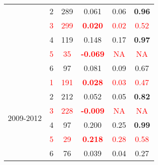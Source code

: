 \begin{table}
\begin{tabular}{rrrrrr}
    \multicolumn{1}{c}{} & \multicolumn{1}{c}{2} & \multicolumn{1}{c}{289} & \multicolumn{1}{c}{0.061 } & \multicolumn{1}{c}{0.06 } & \multicolumn{1}{c}{\textbf{0.96}} \\
    \multicolumn{1}{c}{} & \multicolumn{1}{c}{\textcolor{red}{3}} & \multicolumn{1}{c}{\textcolor{red}{299}} & \multicolumn{1}{c}{\textcolor{red}{\textbf{0.020}}} & \multicolumn{1}{c}{\textcolor{red}{0.02}} & \multicolumn{1}{c}{\textcolor{red}{0.52}} \\
    \multicolumn{1}{c}{} & \multicolumn{1}{c}{4} & \multicolumn{1}{c}{119} & \multicolumn{1}{c}{0.148 } & \multicolumn{1}{c}{0.17 } & \multicolumn{1}{c}{\textbf{0.97}} \\
    \multicolumn{1}{c}{} & \multicolumn{1}{c}{\textcolor{red}{5}} & \multicolumn{1}{c}{\textcolor{red}{35}} & \multicolumn{1}{c}{\textcolor{red}{\textbf{-0.069}}} & \multicolumn{1}{c}{\textcolor{red}{NA}} & \multicolumn{1}{c}{\textcolor{red}{NA}} \\
    \multicolumn{1}{c}{} & \multicolumn{1}{c}{6} & \multicolumn{1}{c}{97} & \multicolumn{1}{c}{0.081 } & \multicolumn{1}{c}{0.09 } & \multicolumn{1}{c}{0.67 } \\\midrule
    \multicolumn{1}{c}{\multirow{6}[2]{*}{\begin{sideways}2009-2012\end{sideways}}} & \multicolumn{1}{c}{\textcolor{red}{1}} & \multicolumn{1}{c}{\textcolor{red}{191}} & \multicolumn{1}{c}{\textcolor{red}{\textbf{0.028}}} & \multicolumn{1}{c}{\textcolor{red}{0.03}} & \multicolumn{1}{c}{\textcolor{red}{0.47}} \\
    \multicolumn{1}{c}{} & \multicolumn{1}{c}{2} & \multicolumn{1}{c}{212} & \multicolumn{1}{c}{0.052 } & \multicolumn{1}{c}{0.05 } & \multicolumn{1}{c}{\textbf{0.82}} \\
    \multicolumn{1}{c}{} & \multicolumn{1}{c}{\textcolor{red}{3}} & \multicolumn{1}{c}{\textcolor{red}{228}} & \multicolumn{1}{c}{\textcolor{red}{\textbf{-0.009}}} & \multicolumn{1}{c}{\textcolor{red}{NA}} & \multicolumn{1}{c}{\textcolor{red}{NA}} \\
    \multicolumn{1}{c}{} & \multicolumn{1}{c}{4} & \multicolumn{1}{c}{97} & \multicolumn{1}{c}{0.200 } & \multicolumn{1}{c}{0.25 } & \multicolumn{1}{c}{\textbf{0.99}} \\
    \multicolumn{1}{c}{} & \multicolumn{1}{c}{\textcolor{red}{5}} & \multicolumn{1}{c}{\textcolor{red}{29}} & \multicolumn{1}{c}{\textcolor{red}{\textbf{0.218}}} & \multicolumn{1}{c}{\textcolor{red}{0.28}} & \multicolumn{1}{c}{\textcolor{red}{0.58}} \\
    \multicolumn{1}{c}{} & \multicolumn{1}{c}{6} & \multicolumn{1}{c}{76} & \multicolumn{1}{c}{0.039 } & \multicolumn{1}{c}{0.04 } & \multicolumn{1}{c}{0.27 } \\
    \bottomrule
    \end{tabular}%
  \label{tab:pHTVPHPA}%
\end{table}%

